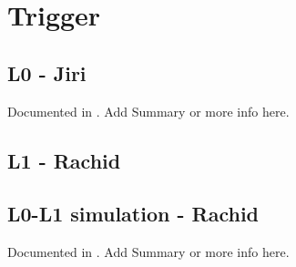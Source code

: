 \section{Trigger}

\subsection{L0 - Jiri}

Documented in \cite{EMCAL:L0}. Add Summary or more info here.

\subsection{L1 - Rachid}

\subsection{L0-L1 simulation - Rachid}



Documented in \cite{EMCAL:HLT}. Add Summary or more info here.